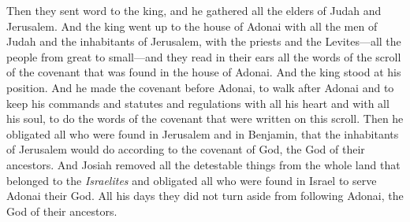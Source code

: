 \begin{biblechapter}
\verse Then they sent word to the king, and he gathered all the elders of Judah and Jerusalem.
\verse And the king went up to the house of Adonai with all the men of Judah and the inhabitants of Jerusalem, with the priests and the Levites—all the people from great to small—and they read in their ears all the words of the scroll of the covenant that was found in the house of Adonai.
\verse And the king stood at his position. And he made the covenant before Adonai, to walk after Adonai and to keep his commands and statutes and regulations with all his heart and with all his soul, to do the words of the covenant that were written on this scroll.
\verse Then he obligated all who were found in Jerusalem and in Benjamin, that the inhabitants of Jerusalem would do according to the covenant of God, the God of their ancestors.
\verse And Josiah removed all the detestable things from the whole land that belonged to the \textit{Israelites} and obligated all who were found in Israel to serve Adonai their God. All his days they did not turn aside from following Adonai, the God of their ancestors.
\end{biblechapter}

